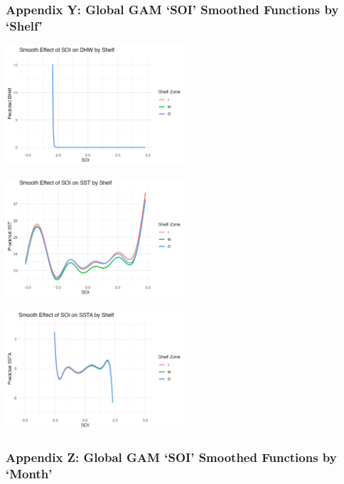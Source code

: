 \documentclass[letterpaper,9pt,twocolumn,twoside,]{pinp}
\begin{document}
\subsubsection{Appendix Y: Global GAM `SOI' Smoothed Functions by
`Shelf'}\label{appendix-y-global-gam-soi-smoothed-functions-by-shelf}

\begin{center}
\includegraphics[width=0.5\textwidth]{report_images/soi_shelf_dhw.png}
\end{center}

\begin{center}
\includegraphics[width=0.5\textwidth]{report_images/soi_shelf_sst.png}
\end{center}

\begin{center}
\includegraphics[width=0.5\textwidth]{report_images/soi_shelf_ssta.png}
\end{center}

\subsubsection{Appendix Z: Global GAM `SOI' Smoothed Functions by
`Month'}\label{appendix-z-global-gam-soi-smoothed-functions-by-month}
\end{document}
